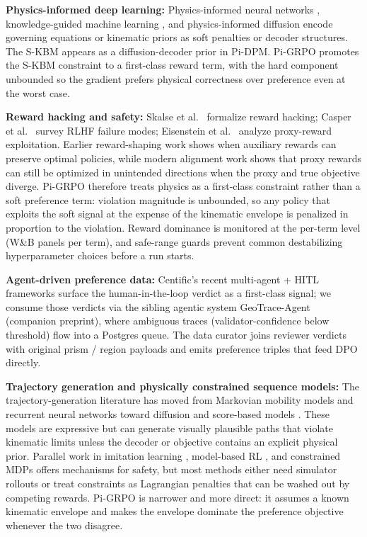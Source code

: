 \documentclass{article}
\begin{document}
\smallskip
\textbf{Physics-informed deep learning:} Physics-informed neural networks \citep{raissi2019pinn}, knowledge-guided machine learning \citep{karpatne2017kgml}, and physics-informed diffusion \citep{sharma2025geoanomalies, ghosh2024kriging, yang2025gcdm} encode governing equations or kinematic priors as soft penalties or decoder structures. The S-KBM \citep{kong2015kinematic} appears as a diffusion-decoder prior in Pi-DPM. Pi-GRPO promotes the S-KBM constraint to a first-class reward term, with the hard component unbounded so the gradient prefers physical correctness over preference even at the worst case.

\smallskip
\textbf{Reward hacking and safety:} Skalse et al.\ \citep{skalse2022defining} formalize reward hacking; Casper et al.\ \citep{casper2023open} survey RLHF failure modes; Eisenstein et al.\ \citep{eisenstein2023helping} analyze proxy-reward exploitation. Earlier reward-shaping work \citep{ng1999policy, potentialbased2003} shows when auxiliary rewards can preserve optimal policies, while modern alignment work shows that proxy rewards can still be optimized in unintended directions when the proxy and true objective diverge. Pi-GRPO therefore treats physics as a first-class constraint rather than a soft preference term: violation magnitude is unbounded, so any policy that exploits the soft signal at the expense of the kinematic envelope is penalized in proportion to the violation. Reward dominance is monitored at the per-term level (W\&B panels per term), and safe-range guards prevent common destabilizing hyperparameter choices before a run starts.

\smallskip
\textbf{Agent-driven preference data:} Centific's recent multi-agent + HITL frameworks \citep{centific2025legalwiz, centific2025contragen, centific2025art} surface the human-in-the-loop verdict as a first-class signal; we consume those verdicts via the sibling agentic system GeoTrace-Agent (companion preprint), where ambiguous traces (validator-confidence below threshold) flow into a Postgres queue. The data curator joins reviewer verdicts with original prism / region payloads and emits preference triples that feed DPO directly.

\smallskip
\textbf{Trajectory generation and physically constrained sequence models:} The trajectory-generation literature has moved from Markovian mobility models and recurrent neural networks toward diffusion and score-based models \citep{ho2020ddpm, song2021score, kong2021diffwave, zhu2024difftraj}. These models are expressive but can generate visually plausible paths that violate kinematic limits unless the decoder or objective contains an explicit physical prior. Parallel work in imitation learning \citep{ross2011dagger, ho2016gail}, model-based RL \citep{sutton1998rl, williams1992simple}, and constrained MDPs \citep{altman1999constrained, achiam2017cpo} offers mechanisms for safety, but most methods either need simulator rollouts or treat constraints as Lagrangian penalties that can be washed out by competing rewards. Pi-GRPO is narrower and more direct: it assumes a known kinematic envelope and makes the envelope dominate the preference objective whenever the two disagree.
\end{document}
